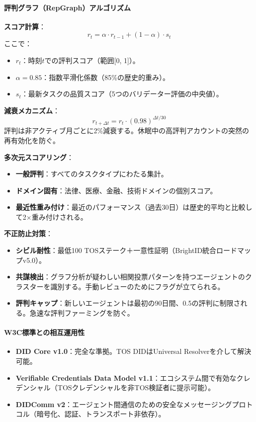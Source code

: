 \documentclass[11pt]{article}
\begin{document}
\paragraph{評判グラフ（RepGraph）アルゴリズム}

\textbf{スコア計算}：
\begin{equation}
r_t = \alpha \cdot r_{t-1} + (1 - \alpha) \cdot s_t
\end{equation}
ここで：
\begin{itemize}[noitemsep]
  \item $r_t$：時刻$t$での評判スコア（範囲[0, 1]）。
  \item $\alpha = 0.85$：指数平滑化係数（85\%の歴史的重み）。
  \item $s_t$：最新タスクの品質スコア（5つのバリデーター評価の中央値）。
\end{itemize}

\textbf{減衰メカニズム}：
\begin{equation}
r_{t+\Delta t} = r_t \cdot (0.98)^{\Delta t / 30}
\end{equation}
評判は非アクティブ月ごとに2\%減衰する。休眠中の高評判アカウントの突然の再有効化を防ぐ。

\textbf{多次元スコアリング}：
\begin{itemize}[noitemsep]
  \item \textbf{一般評判}：すべてのタスクタイプにわたる集計。
  \item \textbf{ドメイン固有}：法律、医療、金融、技術ドメインの個別スコア。
  \item \textbf{最近性重み付け}：最近のパフォーマンス（過去30日）は歴史的平均と比較して2$\times$重み付けされる。
\end{itemize}

\textbf{不正防止対策}：
\begin{itemize}[noitemsep]
  \item \textbf{シビル耐性}：最低100 TOSステーク＋一意性証明（BrightID統合ロードマップv5.0）。
  \item \textbf{共謀検出}：グラフ分析が疑わしい相関投票パターンを持つエージェントのクラスターを識別する。手動レビューのためにフラグが立てられる。
  \item \textbf{評判キャップ}：新しいエージェントは最初の90日間、0.5の評判に制限される。急速な評判ファーミングを防ぐ。
\end{itemize}

\paragraph{W3C標準との相互運用性}
\begin{itemize}[noitemsep]
  \item \textbf{DID Core v1.0}：完全な準拠。TOS DIDはUniversal Resolverを介して解決可能。
  \item \textbf{Verifiable Credentials Data Model v1.1}：エコシステム間で有効なクレデンシャル（TOSクレデンシャルを非TOS検証者に提示可能）。
  \item \textbf{DIDComm v2}：エージェント間通信のための安全なメッセージングプロトコル（暗号化、認証、トランスポート非依存）。
\end{itemize}
\end{document}
